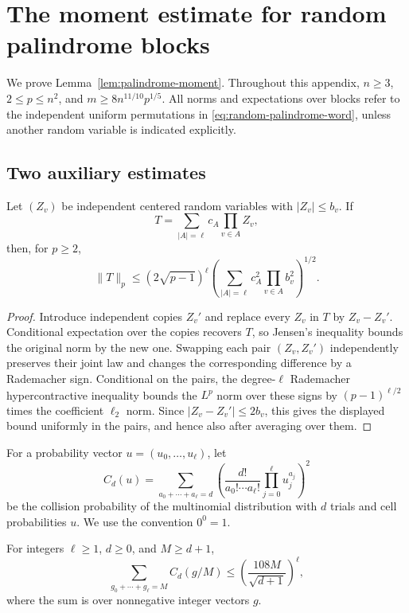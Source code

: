 \section{The moment estimate for random palindrome blocks}
\label{app:approximate-proof}

We prove Lemma~\ref{lem:palindrome-moment}.  Throughout this appendix,
$n\geq3$, $2\leq p\leq n^2$, and
$m\geq8n^{11/10}p^{1/5}$.  All norms and expectations over blocks refer
to the independent uniform permutations in
\eqref{eq:random-palindrome-word}, unless another random variable is
indicated explicitly.

\subsection{Two auxiliary estimates}

\begin{lemma}\label{lem:palindrome-chaos}
Let $(Z_v)$ be independent centered random variables with $|Z_v|\leq b_v$.
If
\[
  T=\sum_{|A|=\ell}c_A\prod_{v\in A}Z_v,
\]
then, for $p\geq2$,
\[
  \|T\|_p\leq(2\sqrt{p-1})^\ell
     \left(\sum_{|A|=\ell}c_A^2\prod_{v\in A}b_v^2\right)^{1/2}.
\]
\end{lemma}

\begin{proof}
Introduce independent copies $Z_v'$ and replace every $Z_v$ in $T$ by
$Z_v-Z_v'$.  Conditional expectation over the copies recovers $T$, so
Jensen's inequality bounds the original norm by the new one.  Swapping
each pair $(Z_v,Z_v')$ independently preserves their joint law and changes
the corresponding difference by a Rademacher sign.  Conditional on the
pairs, the degree-$\ell$ Rademacher hypercontractive inequality
\cite{bonami1970,odonnell2014} bounds the $L^p$ norm over these signs by
$(p-1)^{\ell/2}$ times the coefficient $\ell_2$ norm.  Since
$|Z_v-Z_v'|\leq2b_v$, this gives the displayed bound uniformly in the
pairs, and hence also after averaging over them.
\end{proof}

For a probability vector $u=(u_0,\ldots,u_\ell)$, let
\[
  C_d(u)=\sum_{a_0+\cdots+a_\ell=d}
       \left(\frac{d!}{a_0!\cdots a_\ell!}
                    \prod_{j=0}^{\ell}u_j^{a_j}\right)^2
\]
be the collision probability of the multinomial distribution with $d$
trials and cell probabilities $u$.  We use the convention $0^0=1$.

\begin{lemma}\label{lem:palindrome-lattice}
For integers $\ell\geq1$, $d\geq0$, and $M\geq d+1$,
\[
  \sum_{g_0+\cdots+g_\ell=M}C_d(g/M)
  \leq\left(\frac{108M}{\sqrt{d+1}}\right)^\ell,
\]
where the sum is over nonnegative integer vectors $g$.
\end{lemma}


